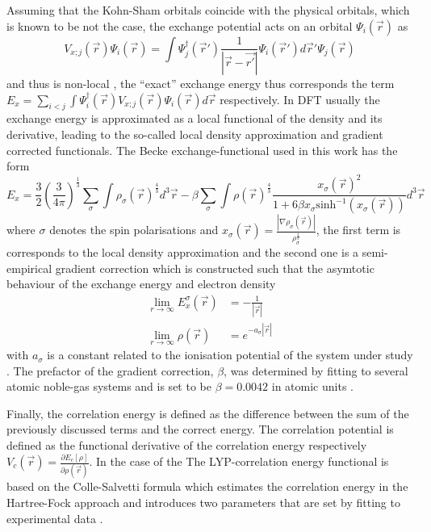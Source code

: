 Assuming that the Kohn-Sham orbitals coincide with the physical orbitals, which is known to be not the case, the exchange potential acts on an orbital $\Psi_i(\vec{r})$ as
\begin{equation}
V_{x;j}(\vec{r})\Psi_i(\vec{r}) =\int \Psi_j^\dagger(\vec{r}')\frac{1}{\left|\vec{r}-\vec{r'}\right|} \Psi_i(\vec{r}') d\vec{r}' \Psi_j(\vec{r})
\end{equation}
and thus is non-local \cite{Holthausen}, the ``exact'' exchange energy thus corresponds the term $E_{x}=\sum_{i<j}\int \Psi_i^\dagger(\vec{r}) V_{x;j}(\vec{r}) \Psi_i(\vec{r}) d\vec{r}$  respectively.
In DFT usually the exchange energy is approximated as a local functional of the density and its derivative, leading to the so-called local density approximation and gradient corrected functionals.
The Becke \cite{blyp} exchange-functional used in this work has the form
\begin{equation} \label{eq:blypXC}
E_x=\frac 32 \left(\frac{3}{4\pi}\right)^\frac 13 \sum_\sigma \int \rho_\sigma(\vec{r})^\frac 43 d^3\vec{r} 
-\beta \sum_\sigma \int \rho(\vec{r})^\frac 43 \frac{x_\sigma(\vec{r})^2}{1+6\beta x_\sigma \text{sinh}^{-1}( x_\sigma (\vec{r}))} d^3\vec{r}
\end{equation}
where $\sigma$ denotes the spin polarisations and $x_\sigma(\vec{r})=\frac{|\nabla \rho_\sigma(\vec{r})|}{\rho_\sigma^\frac 43}$, the first term is corresponds to the local density approximation and the second one is a semi-empirical gradient correction which is constructed such that the asymtotic behaviour of the exchange energy and electron density
\begin{align}
  \lim_{r\rightarrow\infty} E_x^\sigma(\vec{r}) & =-\frac{1}{|\vec{r}|} \\
  \lim_{r\rightarrow\infty} \rho(\vec{r}) & =e^{-a_\sigma |\vec{r}|}
\end{align}
with $a_\sigma$ is a constant related to the ionisation potential of the system under study \cite{blyp}.
The prefactor of the gradient correction, $\beta$, was determined by fitting to several atomic noble-gas systems and is set to be $\beta=0.0042$ in atomic units \cite{blyp}.

Finally, the correlation energy is defined as the difference between the sum of the previously discussed terms and the correct energy.
The correlation potential is defined as the functional derivative of the correlation energy respectively $V_c(\vec{r})=\frac{\partial E_c[\rho]}{\partial\rho(\vec{r})}$.
In the case of the
The LYP-correlation energy functional is based on the Colle-Salvetti formula which estimates the correlation energy in the Hartree-Fock approach and introduces two parameters that are set by fitting to experimental data \cite{lyp}.

